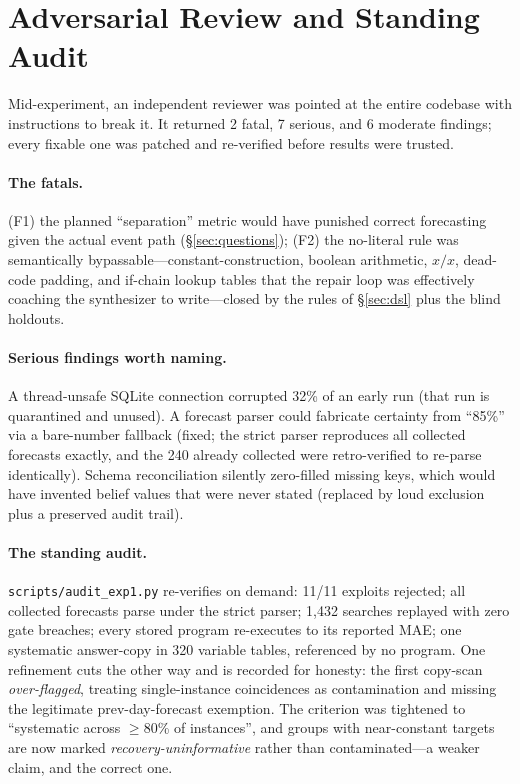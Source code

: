 \documentclass[10pt]{article}
\begin{document}
\FloatBarrier
\section{Adversarial Review and Standing Audit}\label{sec:audit}
Mid-experiment, an independent reviewer was pointed at the entire codebase with instructions to
break it. It returned 2 fatal, 7 serious, and 6 moderate findings; every fixable one was patched
and re-verified before results were trusted.

\paragraph{The fatals.} (F1) the planned ``separation'' metric would have punished correct
forecasting given the actual event path (\S\ref{sec:questions}); (F2) the no-literal rule was
semantically bypassable---constant-construction, boolean arithmetic, $x/x$, dead-code padding, and
if-chain lookup tables that the repair loop was effectively coaching the synthesizer to
write---closed by the rules of \S\ref{sec:dsl} plus the blind holdouts.

\paragraph{Serious findings worth naming.} A thread-unsafe SQLite connection corrupted 32\% of an
early run (that run is quarantined and unused). A forecast parser could fabricate certainty from
``85\%'' via a bare-number fallback (fixed; the strict parser reproduces all collected forecasts
exactly, and the 240 already collected were retro-verified to re-parse identically). Schema
reconciliation silently zero-filled missing keys, which would have invented belief values that
were never stated (replaced by loud exclusion plus a preserved audit trail).

\paragraph{The standing audit.} \texttt{scripts/audit\_exp1.py} re-verifies on demand: 11/11
exploits rejected; all collected forecasts parse under the strict parser; 1{,}432 searches
replayed with zero gate breaches; every stored program re-executes to its reported MAE; one
systematic answer-copy in 320 variable tables, referenced by no program. One refinement cuts the
other way and is recorded for honesty: the first copy-scan \emph{over-flagged}, treating
single-instance coincidences as contamination and missing the legitimate prev-day-forecast
exemption. The criterion was tightened to ``systematic across $\ge$80\% of instances'', and
groups with near-constant targets are now marked \emph{recovery-uninformative} rather than
contaminated---a weaker claim, and the correct one.
\end{document}
